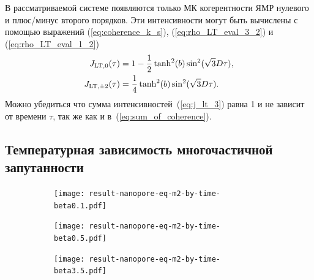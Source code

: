 В рассматриваемой системе появляются только МК когерентности ЯМР нулевого и плюс/минус второго порядков.
Эти интенсивности могут быть вычислены с помощью выражений
(\ref{eq:coherence_k_s}), (\ref{eq:rho_LT_eval_3_2}) и (\ref{eq:rho_LT_eval_1_2})
%
\begin{align}\label{eq:j_lt_3}
  J_{\mathrm{LT}, 0}(\tau) & = 1 - \frac 1 2 \tanh^2(b)\sin^2(\sqrt 3 D \tau), \notag \\
  J_{\mathrm{LT},\pm 2}(\tau) & = \frac 1 4 \tanh^2(b)\sin^2(\sqrt 3 D \tau).
\end{align}
%
Можно убедиться что сумма интенсивностей~(\ref{eq:j_lt_3}) равна 1
и не зависит от времени $\tau$, так же как и в~(\ref{eq:sum_of_coherence}).


\subsection{Температурная зависимость многочастичной запутанности}
\label{sec:entanglement}

\begin{figure}[h]
  \centering
  \begin{subfigure}[t]{0.31\textwidth}
    \centering
    \texttt{[image: result-nanopore-eq-m2-by-time-beta0.1.pdf]}
    \caption{\protect}
    \label{fig:result-nanopore-eq-m2-by-time-beta0.1}
  \end{subfigure}
  \hfill
  \begin{subfigure}[t]{0.32\textwidth}
    \centering
    \texttt{[image: result-nanopore-eq-m2-by-time-beta0.5.pdf]}
    \caption{\protect}
    \label{fig:result-nanopore-eq-m2-by-time-beta0.5}
  \end{subfigure}
  \hfill
  \begin{subfigure}[t]{0.34\textwidth}
    \centering
    \texttt{[image: result-nanopore-eq-m2-by-time-beta3.5.pdf]}
    \caption{\protect}
    \label{fig:result-nanopore-eq-m2-by-time-beta3.5}
  \end{subfigure}
  \caption{\protect}
  \label{fig:result-nanopore-eq-m2-by-time-betas}
\end{figure}

